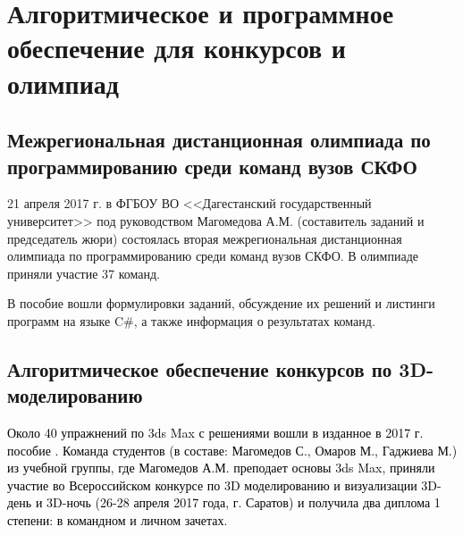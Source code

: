 \chapter{Алгоритмическое и программное обеспечение для конкурсов и олимпиад}\label{AKM_ch4}


%

\section{Межрегиональная дистанционная олимпиада по программированию среди команд вузов СКФО}\label{AKM_ch4_2}

21 апреля 2017 г. в ФГБОУ ВО <<Дагестанский государственный университет>> под руководством Магомедова
	А.М. (составитель заданий и председатель жюри) состоялась вторая межрегиональная дистанционная олимпиада по
	программированию среди команд вузов СКФО. В олимпиаде приняли участие 37 команд.

В пособие \cite{AKM_ch4_bib1} вошли формулировки заданий, обсуждение их решений и листинги программ на языке C\#, а
	также информация о результатах команд.

\section{Алгоритмическое обеспечение конкурсов по 3D-моделированию}\label{AKM_ch4_3}

\textcolor{black}{Около 40 упражнений по 3ds Max с решениями вошли в изданное в 2017 г. пособие \cite{AKM_ch4_bib2}. Команда студентов
	(в составе: Магомедов С., Омаров М., Гаджиева М.) из учебной группы, где Магомедов А.М. преподает основы
	3}\foreignlanguage{english}{\textcolor{black}{ds}}\textcolor{black}{
}\foreignlanguage{english}{\textcolor{black}{Max}}\textcolor{black}{, приняли участие во Всероссийском конкурсе по 3D
	моделированию и визуализации 3D-день и 3D-ночь (26-28 апреля 2017 года, г. Саратов) и
	получила два диплома 1 степени: в командном и личном зачетах.}

